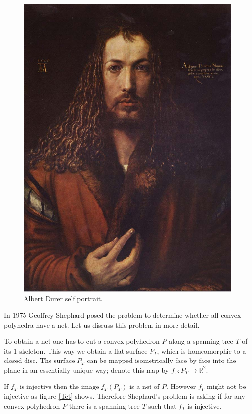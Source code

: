 \documentclass[openright, 12pt]{article}
\begin{document}
\begin{figure}[h]
\centering
\includegraphics[scale=0.2]{Durer.eps}
\caption{Albert Durer self portrait.}
\end{figure}



In 1975 Geoffrey Shephard \cite{Sh} posed the problem to determine whether all convex polyhedra have a net. Let us discuss this problem in more detail. 



To obtain a net one has to cut a convex polyhedron $P$ along a spanning tree $T$ of its 1-skeleton. This way we obtain a flat surface $P_T$, which is homeomorphic to a closed disc. The surface $P_T$ can be mapped isometrically face by face into the plane in an essentially unique way; denote this map by $f_T\colon P_T\to \mathbb{R}^2$. 


If $f_T$ is injective then the image $f_T(P_T)$ is a net of $P$. However $f_T$ might not be injective as figure \ref{Tet} shows. Therefore Shephard's problem is asking if for any convex polyhedron $P$ there is a spanning tree $T$ such that $f_T$ is injective.
\end{document}
